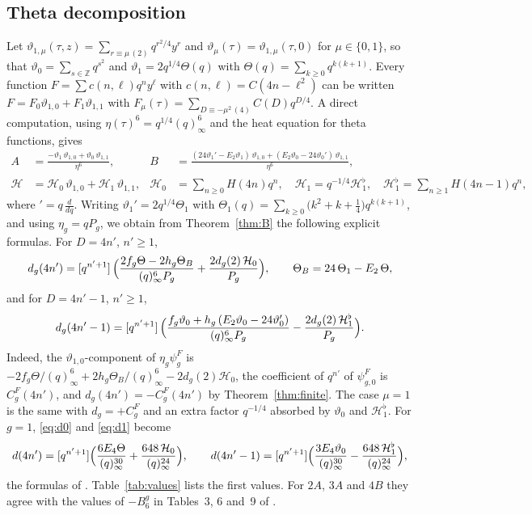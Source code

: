 \documentclass[11pt]{amsart}
\theoremstyle{definition}
\newcommand{\ZZ}{\mathbb{Z}}
\newcommand{\vt}{\vartheta}
\newcommand{\cH}{\mathcal H}
\begin{document}
\subsection{Theta decomposition}
Let $\vt_{1,\mu}(\tau,z)=\sum_{r\equiv\mu\,(2)}q^{r^2/4}y^r$ and $\vt_\mu(\tau)=\vt_{1,\mu}(\tau,0)$ for $\mu\in\{0,1\}$, so that $\vt_0=\sum_{s\in\ZZ}q^{s^2}$ and $\vt_1=2q^{1/4}\Theta(q)$ with $\Theta(q)=\sum_{k\ge0}q^{k(k+1)}$. Every function $F=\sum c(n,\ell)q^ny^\ell$ with $c(n,\ell)=C(4n-\ell^2)$ can be written $F=F_0\vt_{1,0}+F_1\vt_{1,1}$ with $F_\mu(\tau)=\sum_{D\equiv-\mu^2\,(4)}C(D)q^{D/4}$. A direct computation, using $\eta(\tau)^6=q^{1/4}(q)_\infty^6$ and the heat equation for theta functions, gives \cite[Section~4]{BM13}
\begin{align*}
A&=\frac{-\vt_1\,\vt_{1,0}+\vt_0\,\vt_{1,1}}{\eta^6},&
B&=\frac{(24\vt_1'-E_2\vt_1)\,\vt_{1,0}+(E_2\vt_0-24\vt_0')\,\vt_{1,1}}{\eta^6},\\
\cH&=\cH_0\,\vt_{1,0}+\cH_1\,\vt_{1,1},&
\cH_0&=\sum_{n\ge0}H(4n)q^n,\quad \cH_1=q^{-1/4}\cH_1^\flat,\quad\cH_1^\flat=\sum_{n\ge1}H(4n-1)q^n,
\end{align*}
where $'=q\,\frac{d}{dq}$. Writing $\vt_1'=2q^{1/4}\Theta_1$ with $\Theta_1(q)=\sum_{k\ge0}\bigl(k^2+k+\tfrac14\bigr)q^{k(k+1)}$, and using $\eta_g=qP_g$, we obtain from Theorem~\ref{thm:B} the following explicit formulas. For $D=4n'$, $n'\ge1$,
\begin{equation}\label{eq:d0}
d_g(4n')=[q^{n'+1}]\,\Bigl(\frac{2f_g\Theta-2h_g\Theta_B}{(q)_\infty^6P_g}+\frac{2d_g(2)\,\cH_0}{P_g}\Bigr),\qquad\Theta_B=24\,\Theta_1-E_2\,\Theta,
\end{equation}
and for $D=4n'-1$, $n'\ge1$,
\begin{equation}\label{eq:d1}
d_g(4n'-1)=[q^{n'+1}]\,\Bigl(\frac{f_g\vt_0+h_g\,(E_2\vt_0-24\vt_0')}{(q)_\infty^6P_g}-\frac{2d_g(2)\,\cH_1^\flat}{P_g}\Bigr).
\end{equation}
Indeed, the $\vt_{1,0}$-component of $\eta_g\psi^F_g$ is $-2f_g\Theta/(q)_\infty^6+2h_g\Theta_B/(q)_\infty^6-2d_g(2)\cH_0$, the coefficient of $q^{n'}$ of $\psi^F_{g,0}$ is $C^F_g(4n')$, and $d_g(4n')=-C^F_g(4n')$ by Theorem~\ref{thm:finite}. The case $\mu=1$ is the same with $d_g=+C^F_g$ and an extra factor $q^{-1/4}$ absorbed by $\vt_0$ and $\cH_1^\flat$. For $g=1$, \eqref{eq:d0} and \eqref{eq:d1} become
\[
d(4n')=[q^{n'+1}]\Bigl(\frac{6E_4\Theta}{(q)^{30}_\infty}+\frac{648\,\cH_0}{(q)^{24}_\infty}\Bigr),\qquad
d(4n'-1)=[q^{n'+1}]\Bigl(\frac{3E_4\vt_0}{(q)^{30}_\infty}-\frac{648\,\cH_1^\flat}{(q)^{24}_\infty}\Bigr),
\]
the formulas of \cite[Section~4]{BM13}. Table~\ref{tab:values} lists the first values. For $2A$, $3A$ and $4B$ they agree with the values of $-B_6^{g}$ in Tables~3, 6 and~9 of \cite{GSSV23}.
\end{document}
